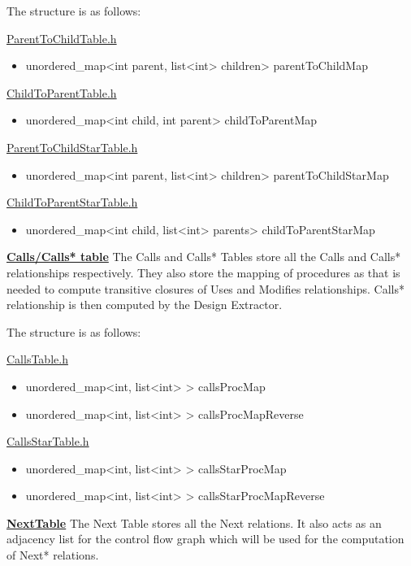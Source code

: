 \documentclass[12pt]{article}
\begin{document}
{{{{The structure is as follows: 

{\underline{ParentToChildTable.h}
\begin{itemize}
\item unordered\_map<int parent, list<int> children> parentToChildMap
\end{itemize}
{\underline{ChildToParentTable.h}
\begin{itemize}
\item unordered\_map<int child, int parent> childToParentMap
\end{itemize}
{\underline{ParentToChildStarTable.h}
\begin{itemize}
\item unordered\_map<int parent, list<int> children> parentToChildStarMap
\end{itemize}
{\underline{ChildToParentStarTable.h}
\begin{itemize}
\item unordered\_map<int child, list<int> parents> childToParentStarMap
\end{itemize}
\vspace{6mm}

\textbf{\underline{Calls/Calls* table}}
\newline The Calls and Calls* Tables store all the Calls and Calls* relationships respectively. They also store the mapping of procedures as that is needed to compute transitive closures of Uses and Modifies relationships. Calls* relationship is then computed by the Design Extractor. 

The structure is as follows: 

{\underline{CallsTable.h}
\begin{itemize}
\item unordered\_map<int, list<int> > callsProcMap
\item unordered\_map<int, list<int> > callsProcMapReverse
\end{itemize}
{\underline{CallsStarTable.h}
\begin{itemize}
\item unordered\_map<int, list<int> > callsStarProcMap
\item unordered\_map<int, list<int> > callsStarProcMapReverse
\end{itemize}
\textbf{\underline{NextTable}}
\newline The Next Table stores all the Next relations. It also acts as an adjacency list for the control flow graph which will be used for the computation of Next* relations.

}}}}}}}}}}
\end{document}
